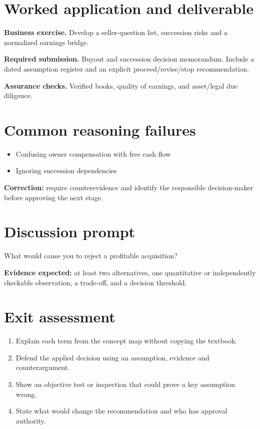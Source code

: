 \documentclass[11pt,letterpaper]{article}
\begin{document}
\section{Worked application and deliverable}
\textbf{Business exercise.} Develop a seller-question list, succession risks and a normalized earnings bridge.\par\textbf{Required submission.} Buyout and succession decision memorandum. Include a dated assumption register and an explicit proceed/revise/stop recommendation.\par\textbf{Assurance checks.} Verified books, quality of earnings, and asset/legal due diligence.
\section{Common reasoning failures}
\begin{itemize}[leftmargin=*,itemsep=3pt]
\item Confusing owner compensation with free cash flow
\item Ignoring succession dependencies
\end{itemize}
\noindent\textbf{Correction:} require counterevidence and identify the responsible decision-maker before approving the next stage.
\section{Discussion prompt}
What would cause you to reject a profitable acquisition?\par\medskip\textbf{Evidence expected:} at least two alternatives, one quantitative or independently checkable observation, a trade-off, and a decision threshold.
\section{Exit assessment}
\begin{enumerate}[leftmargin=*,itemsep=5pt]
\item Explain each term from the concept map without copying the textbook.
\item Defend the applied decision using an assumption, evidence and counterargument.
\item Show an objective test or inspection that could prove a key assumption wrong.
\item State what would change the recommendation and who has approval authority.
\end{enumerate}

\end{document}
